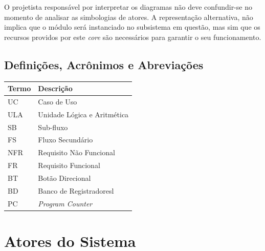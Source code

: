 \documentclass{article}
\begin{document}
  O projetista responsável por interpretar os diagramas não deve confundir-se no momento de analisar as simbologias de atores. A representação alternativa, não implica que o módulo será instanciado no subsistema em questão, mas sim que os recursos providos por este \textit{core} são necessários para garantir o seu funcionamento.
  
  \subsection{Definições, Acrônimos e Abreviações}
  \FloatBarrier
    \begin{table}[H] 
      \begin{center}
        \begin{tabular}[pos]{|m{2cm} | m{8cm}|} 
          \hline 
          \cellcolor[gray]{0.9}\textbf{Termo} & \cellcolor[gray]{0.9}\textbf{Descrição} \\ \hline
          UC & Caso de Uso  \\ \hline
          ULA & Unidade Lógica e Aritmética \\ \hline
          SB & Sub-fluxo \\ \hline
          FS & Fluxo Secundário \\ \hline
          NFR & Requisito Não Funcional \\ \hline
          FR & Requisito Funcional \\ \hline
          BT & Botão Direcional \\ \hline
	BD & Banco de Registradoresl \\ \hline
          PC & \textit{Program Counter} \\
          \hline
        \end{tabular}
      \end{center}
    \label{tab:definicoes}
    \end{table}

  \section{Atores do Sistema}
  
\end{document}
